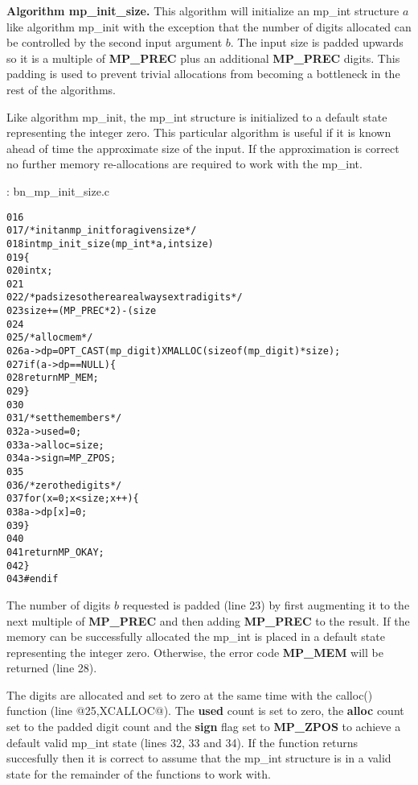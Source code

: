 \documentclass[b5paper]{book}
\begin{document}
\textbf{Algorithm mp\_init\_size.}
This algorithm will initialize an mp\_int structure $a$ like algorithm mp\_init with the exception that the number of 
digits allocated can be controlled by the second input argument $b$.  The input size is padded upwards so it is a 
multiple of \textbf{MP\_PREC} plus an additional \textbf{MP\_PREC} digits.  This padding is used to prevent trivial 
allocations from becoming a bottleneck in the rest of the algorithms.

Like algorithm mp\_init, the mp\_int structure is initialized to a default state representing the integer zero.  This 
particular algorithm is useful if it is known ahead of time the approximate size of the input.  If the approximation is
correct no further memory re-allocations are required to work with the mp\_int.

\vspace{+3mm}\begin{small}
\hspace{-5.1mm}{\bf File}: bn\_mp\_init\_size.c
\vspace{-3mm}
\begin{alltt}
016   
017   /* init an mp_init for a given size */
018   int mp_init_size (mp_int * a, int size)
019   \{
020     int x;
021   
022     /* pad size so there are always extra digits */
023     size += (MP_PREC * 2) - (size % MP_PREC);    
024     
025     /* alloc mem */
026     a->dp = OPT_CAST(mp_digit) XMALLOC (sizeof (mp_digit) * size);
027     if (a->dp == NULL) \{
028       return MP_MEM;
029     \}
030   
031     /* set the members */
032     a->used  = 0;
033     a->alloc = size;
034     a->sign  = MP_ZPOS;
035   
036     /* zero the digits */
037     for (x = 0; x < size; x++) \{
038         a->dp[x] = 0;
039     \}
040   
041     return MP_OKAY;
042   \}
043   #endif
\end{alltt}
\end{small}

The number of digits $b$ requested is padded (line 23) by first augmenting it to the next multiple of 
\textbf{MP\_PREC} and then adding \textbf{MP\_PREC} to the result.  If the memory can be successfully allocated the 
mp\_int is placed in a default state representing the integer zero.  Otherwise, the error code \textbf{MP\_MEM} will be 
returned (line 28).  

The digits are allocated and set to zero at the same time with the calloc() function (line @25,XCALLOC@).  The 
\textbf{used} count is set to zero, the \textbf{alloc} count set to the padded digit count and the \textbf{sign} flag set 
to \textbf{MP\_ZPOS} to achieve a default valid mp\_int state (lines 32, 33 and 34).  If the function 
returns succesfully then it is correct to assume that the mp\_int structure is in a valid state for the remainder of the 
functions to work with.
\end{document}
